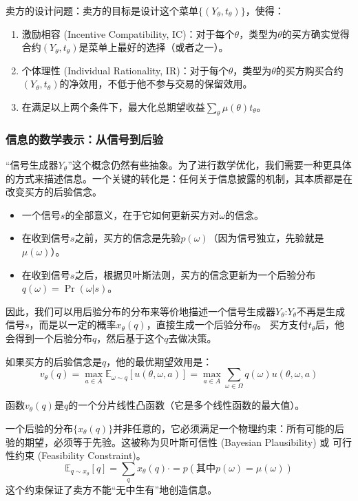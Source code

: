 卖方的设计问题：卖方的目标是设计这个菜单$\{(Y_\theta,t_\theta)\}$，使得：

\begin{enumerate}
    \item 激励相容 (Incentive Compatibility, IC)：对于每个$\theta$，类型为$\theta$的买方确实觉得合约$(Y_\theta,t_\theta)$是菜单上最好的选择（或者之一）。
    \item 个体理性 (Individual Rationality, IR)：对于每个$\theta$，类型为$\theta$的买方购买合约$(Y_\theta,t_\theta)$的净效用，不低于他不参与交易的保留效用。
    \item 在满足以上两个条件下，最大化总期望收益$\sum\limits_{\theta}\mu(\theta)t_\theta$。
\end{enumerate}

\subsubsection{信息的数学表示：从信号到后验}

“信号生成器$Y_\theta$”这个概念仍然有些抽象。为了进行数学优化，我们需要一种更具体的方式来描述信息。一个关键的转化是：任何关于信息披露的机制，其本质都是在改变买方的后验信念。

\begin{itemize}
    \item 一个信号$s$的全部意义，在于它如何更新买方对$\omega$的信念。
    \item 在收到信号$s$之前，买方的信念是先验$p(\omega)$（因为信号独立，先验就是$\mu(\omega)$）。
    \item 在收到信号$s$之后，根据贝叶斯法则，买方的信念更新为一个后验分布$q(\omega)=\Pr(\omega|s)$。
\end{itemize}

因此，我们可以用后验分布的分布来等价地描述一个信号生成器$Y_\theta$:$Y_\theta$不再是生成信号$s$，而是以一定的概率$x_\theta (q)$，直接生成一个后验分布$q$。
买方支付$t_\theta$后，他会得到一个后验分布$q$，然后基于这个$q$去做决策。

如果买方的后验信念是$q$，他的最优期望效用是：
$$v_\theta(q)=\max_{a\in A}\mathbb{E}_{\omega\sim q}[u(\theta,\omega,a)]=\max_{a\in A}\sum\limits_{\omega\in\Omega}q(\omega)u(\theta,\omega,a)$$

函数$v_\theta(q)$是$q$的一个分片线性凸函数（它是多个线性函数的最大值）。

一个后验的分布$\{x_\theta (q)\}$并非任意的，它必须满足一个物理约束：所有可能的后验的期望，必须等于先验。这被称为贝叶斯可信性 (Bayesian Plausibility) 或 可行性约束 (Feasibility Constraint)。
$$\mathbb{E}_{q\sim x_\theta}[q]=\sum\limits_{q}x_\theta (q)\cdot = p (\text{其中}p(\omega)=\mu(\omega))$$
这个约束保证了卖方不能“无中生有”地创造信息。

